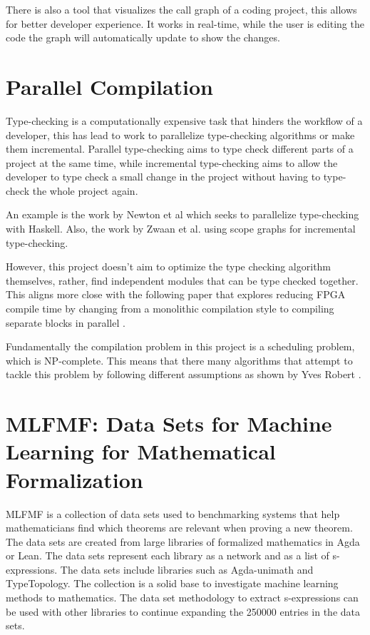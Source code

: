 There is also a tool \cite{call_graph_vis} that visualizes the call graph of a
coding project, this allows for better developer experience. It works in
real-time, while the user is editing the code the graph will automatically
update to show the changes.

\section{Parallel Compilation}

Type-checking is a computationally expensive task that hinders the workflow of
a developer, this has lead to work to parallelize type-checking algorithms or
make them incremental. Parallel type-checking aims to type check different
parts of a project at the same time, while incremental type-checking aims to
allow the developer to type check a small change in the project without having
to type-check the whole project again.

An example is the work by Newton et al \cite{paralele_comp_haskell} which seeks to
parallelize type-checking with Haskell. Also, the work by Zwaan et al.
\cite{incremental_type_checking} using scope graphs for incremental
type-checking.

However, this project doesn't aim to optimize the type checking algorithm
themselves, rather, find independent modules that can be type checked together.
This aligns more close with the following paper that explores reducing FPGA
compile time by changing from a monolithic compilation style to compiling
separate blocks in parallel \cite{FPGA}.

Fundamentally the compilation problem in this project is a scheduling problem,
which is NP-complete\cite{scheduling}. This means that there many algorithms
that attempt to tackle this problem by following different assumptions as shown
by Yves Robert \cite{scheduling}.



\section{MLFMF: Data Sets for Machine Learning for Mathematical Formalization}

MLFMF is a collection of data sets used to benchmarking systems that help
mathematicians find which theorems are relevant when proving a new theorem. The
data sets are created from large libraries of formalized mathematics in Agda or
Lean. The data sets represent each library as a network and as a list of
s-expressions. The data sets include libraries such as Agda-unimath and
TypeTopology. The collection is a solid base to investigate machine learning
methods to mathematics. The data set methodology to extract s-expressions can
be used with other libraries to continue expanding the 250000 entries in the
data sets.

